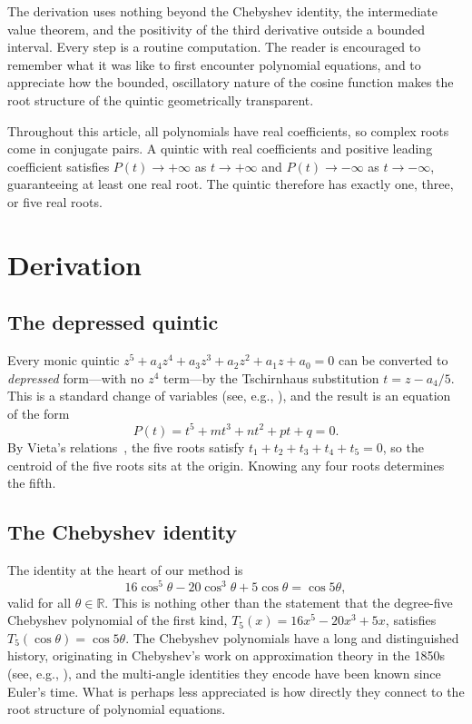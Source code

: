\documentclass[12pt]{article}
\theoremstyle{definition}
\theoremstyle{remark}
\begin{document}
The derivation uses nothing beyond the Chebyshev identity, the intermediate value theorem, and the positivity of the third derivative outside a bounded interval. Every step is a routine computation. The reader is encouraged to remember what it was like to first encounter polynomial equations, and to appreciate how the bounded, oscillatory nature of the cosine function makes the root structure of the quintic geometrically transparent.

Throughout this article, all polynomials have real coefficients, so complex roots come in conjugate pairs. A quintic with real coefficients and positive leading coefficient satisfies $P(t) \to +\infty$ as $t \to +\infty$ and $P(t) \to -\infty$ as $t \to -\infty$, guaranteeing at least one real root. The quintic therefore has exactly one, three, or five real roots.

\section{Derivation}

\subsection{The depressed quintic}

Every monic quintic $z^5 + a_4 z^4 + a_3 z^3 + a_2 z^2 + a_1 z + a_0 = 0$ can be converted to \emph{depressed} form---with no $z^4$ term---by the Tschirnhaus substitution $t = z - a_4/5$. This is a standard change of variables (see, e.g., \cite{King2009}), and the result is an equation of the form
\begin{equation}\label{eq:depressed}
P(t) = t^5 + mt^3 + nt^2 + pt + q = 0.
\end{equation}
By Vieta's relations~\cite{Viete1646}, the five roots satisfy $t_1 + t_2 + t_3 + t_4 + t_5 = 0$, so the centroid of the five roots sits at the origin. Knowing any four roots determines the fifth.

\subsection{The Chebyshev identity}

The identity at the heart of our method is
\begin{equation}\label{eq:cheb5}
16\cos^5\theta - 20\cos^3\theta + 5\cos\theta = \cos 5\theta,
\end{equation}
valid for all $\theta \in \mathbb{R}$. This is nothing other than the statement that the degree-five Chebyshev polynomial of the first kind, $T_5(x) = 16x^5 - 20x^3 + 5x$, satisfies $T_5(\cos\theta) = \cos 5\theta$. The Chebyshev polynomials have a long and distinguished history, originating in Chebyshev's work on approximation theory in the 1850s (see, e.g., \cite{Mason2003}), and the multi-angle identities they encode have been known since Euler's time. What is perhaps less appreciated is how directly they connect to the root structure of polynomial equations.
\end{document}
